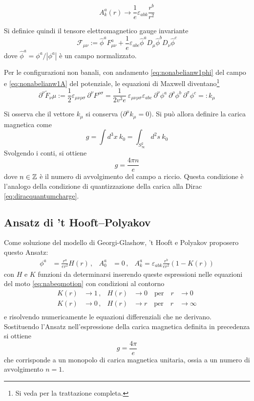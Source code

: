 \begin{equation}\label{eq:nonabelianw1A}
   A_k^a (r) \to \frac{1}{e} \varepsilon_{abk} \frac{r^b}{r^2}
\end{equation}

Si definice quindi il tensore elettromagnetico gauge invariante
\begin{equation}
   \mathcal{F}_{\mu\nu} := \hat{\phi}^a F^a_{\mu\nu}
          + \frac{1}{e} \varepsilon_{abc} \hat{\phi}^a D_\mu\hat{\phi}^b D_\nu \hat{\phi}^c
\end{equation}
dove $\hat{\phi}^a = \phi^a/|\phi^a|$ è un campo normalizzato.

Per le configurazioni non banali, con andamento \ref{eq:nonabelianw1phi} del campo
e \ref{eq:nonabelianw1A} del potenziale, le equazioni di Maxwell diventano\footnote{
   Si veda \cite{nakahara} per la trattazione completa.
}
$$
   \partial ^\nu \tilde{F}_\nu\mu :=
       \frac{1}{2} \varepsilon_{\mu\nu\rho\sigma} \: \partial ^\nu F^{\rho\sigma} =
       \frac{1}{2 v^3 e} \: \varepsilon_{\mu\nu\rho\sigma}\varepsilon_{abc} \:
       \partial^\nu \phi^a \: \partial^\rho \phi^b \: \partial^\sigma \phi^c
    =: k_\mu
$$

Si osserva che il vettore $k_\mu$ si conserva ($\partial ^\mu k_\mu = 0$).
Si può allora definire la carica magnetica come
$$
   g = \int d^3 x \: k_0 = \int_{S^2_\infty} d^2s \: k_0
$$
Svolgendo i conti, si ottiene
\begin{equation}\label{eq:nonabelianquantumcharge}
   g = \frac{4\pi n}{e}
\end{equation}
dove $n \in \mathbb{Z}$ è il numero di avvolgimento del campo a riccio.
Questa condizione è l'analogo della condizione di quantizzazione
della carica alla Dirac \ref{eq:diracquantumcharge}.
\subsection{Ansatz di ’t Hooft–Polyakov}
Come soluzione del modello di Georgi-Glashow, ’t Hooft e Polyakov proposero questo Ansatz:
\begin{equation}
   \begin{aligned}
      \phi^a & = \frac{r^a}{er^2}H(r) \, ,&
      A_0^a & = 0 \, ,&
      A_k^a = \varepsilon_{abk}\frac{r^b}{er^2}(1-K(r))
   \end{aligned}
\end{equation}
con $H$ e $K$ funzioni da determinarsi inserendo queste espressioni nelle equazioni
del moto \ref{eq:nabeqmotion} con condizioni al contorno
\begin{equation}
   \begin{aligned}
      K(r) &\to 1 \, ,& H(r) &\to 0 \quad \mathrm{per} \quad r & \to 0 \\
      K(r) &\to 0 \, ,& H(r) &\to r \quad \mathrm{per} \quad r & \to \infty \\
   \end{aligned}
\end{equation}
e risolvendo numericamente le equazioni differenziali che ne derivano.\\

Sostituendo l'Ansatz nell'espressione della carica magnetica definita in precedenza
si ottiene
\begin{equation}
   g = \frac{4\pi}{e}
\end{equation}
che corrisponde a un monopolo di carica magnetica unitaria, ossia a un
numero di avvolgimento $n = 1$.\\
